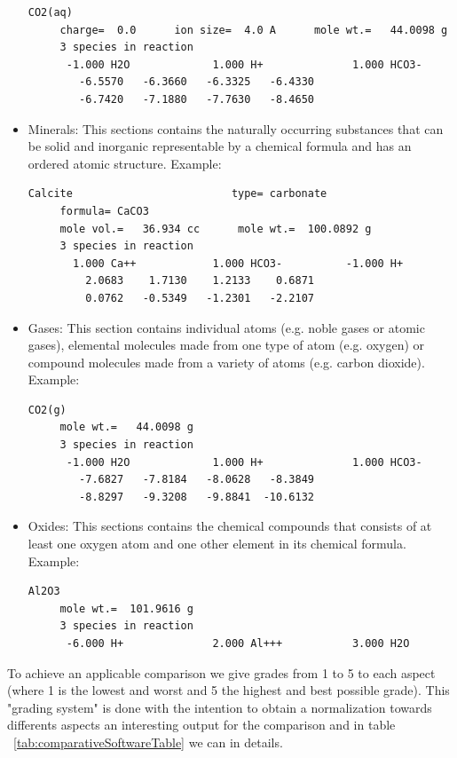 \documentclass[ppgc,mestrado,english]{iiufrgs}
\begin{document}
\begin{itemize}
\begin{lstlisting}[frame=single, caption=Excerpt of the section Aqueous Species]
CO2(aq)
     charge=  0.0      ion size=  4.0 A      mole wt.=   44.0098 g
     3 species in reaction
      -1.000 H2O             1.000 H+              1.000 HCO3-
        -6.5570   -6.3660   -6.3325   -6.4330
        -6.7420   -7.1880   -7.7630   -8.4650
\end{lstlisting}
\item Minerals: This sections contains the naturally occurring substances that can be solid and inorganic representable by a chemical formula and has an ordered atomic structure. Example: 

\begin{lstlisting}[frame=single, caption=Excerpt of the section Minerals]
Calcite                         type= carbonate
     formula= CaCO3
     mole vol.=   36.934 cc      mole wt.=  100.0892 g
     3 species in reaction
       1.000 Ca++            1.000 HCO3-          -1.000 H+
         2.0683    1.7130    1.2133    0.6871
         0.0762   -0.5349   -1.2301   -2.2107
\end{lstlisting}
\item Gases: This section contains individual atoms (e.g. noble gases or atomic gases), elemental molecules made from one type of atom (e.g. oxygen) or compound molecules made from a variety of atoms (e.g. carbon dioxide). Example: 

\begin{lstlisting}[frame=single, caption=Excerpt of the section Gases]
CO2(g)
     mole wt.=   44.0098 g
     3 species in reaction
      -1.000 H2O             1.000 H+              1.000 HCO3-
        -7.6827   -7.8184   -8.0628   -8.3849
        -8.8297   -9.3208   -9.8841  -10.6132
\end{lstlisting}
\item Oxides: This sections contains the chemical compounds that consists of at least one oxygen atom and one other element in its chemical formula. Example: 

\begin{lstlisting}[frame=single, caption=Excerpt of the section Oxides]
Al2O3
     mole wt.=  101.9616 g
     3 species in reaction
      -6.000 H+              2.000 Al+++           3.000 H2O
\end{lstlisting}
\end{itemize}

To achieve an applicable comparison we give grades from 1 to 5 to each aspect (where 1 is the lowest and worst and 5 the highest and best possible grade). This "grading system" is done with the intention to obtain a normalization towards differents aspects an interesting output for the comparison and in table ~\ref{tab:comparativeSoftwareTable} we can in details.
\end{document}
